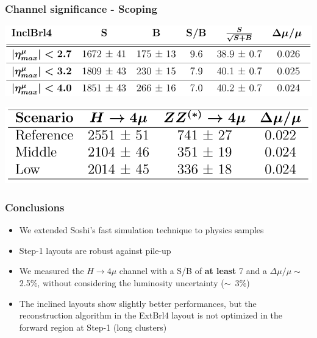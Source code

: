 \documentclass{beamer}
\begin{document}
\begin{frame}[t]
\frametitle{Channel significance - Scoping}

\includegraphics[width=.8\textwidth]{significanceInclBrl4}

\bigskip

\includegraphics[width=.6\textwidth]{scopingSignificance}

\end{frame}


\begin{frame}
\frametitle{Conclusions}
\begin{itemize}
\item<1-> We extended Soshi's fast simulation technique to physics samples
\item<2-> Step-1 layouts are robust against pile-up
\item<3-> We measured the $H \rightarrow 4\mu$ channel with a S/B of \textbf{at least} 7 and
a $\Delta\mu/\mu \sim$ 2.5\%, without considering the luminosity uncertainty \mbox{($\sim$ 3\%)}
\item<4-> The inclined layouts show slightly better performances, but the reconstruction
algorithm in the ExtBrl4 layout is not 
optimized in the forward region at Step-1 (long clusters)
\end{itemize}

\end{frame}



\end{document}
